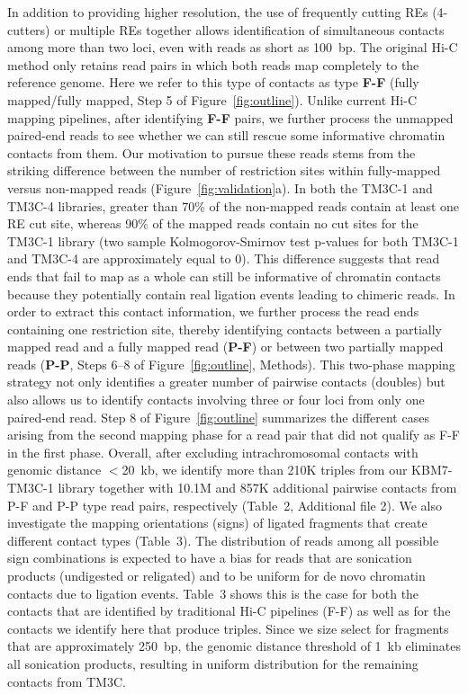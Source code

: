 In addition to providing higher resolution, the use of frequently cutting REs
(4-cutters) or multiple REs together allows identification of simultaneous
contacts among more than two loci, even with reads as short as
100~bp.
The original Hi-C method only retains read pairs in which
both reads map completely to the reference genome. Here we refer to
this type of contacts as type \textbf{F-F} (fully mapped/fully mapped,
Step 5 of Figure~\ref{fig:outline}). Unlike current Hi-C mapping
pipelines, after identifying {\bf F-F}
pairs, we further process the unmapped paired-end reads to see whether we can still
rescue some informative chromatin contacts from them. Our motivation to pursue
these reads stems from the striking difference between the number of restriction
sites within fully-mapped versus non-mapped reads
(Figure~\ref{fig:validation}a). In both the TM3C-1 and TM3C-4
libraries, greater than 70\% of the
non-mapped reads contain at least one RE cut site,
whereas 90\% of the mapped reads contain no cut sites for the TM3C-1 library
(two sample Kolmogorov-Smirnov test p-values for both TM3C-1 and TM3C-4 are approximately equal to 0).
This difference
suggests that read ends that fail to map as a whole can still be informative of
chromatin contacts because they potentially contain real ligation events leading
to chimeric reads. In order to extract this contact information, we further process
the read ends containing one restriction site, thereby identifying contacts
between a partially mapped read and a fully mapped read (\textbf{P-F})
or between two partially mapped reads (\textbf{P-P}, Steps 6--8 of
Figure~\ref{fig:outline}, Methods). This two-phase
mapping strategy not only identifies a
greater number of pairwise contacts (doubles) but also allows
us to identify contacts involving three or four loci from only one paired-end read.
Step 8 of Figure~\ref{fig:outline} summarizes the different cases arising from the second
mapping phase for a read pair that did not qualify as {F-F} in the
first phase. Overall, after excluding intrachromosomal contacts with
genomic distance $<$20~kb, we identify more than 210K triples from our KBM7-TM3C-1
library together with 10.1M and 857K additional pairwise contacts from {P-F}
and {P-P} type read pairs, respectively (Table~2, Additional file 2).
We also investigate the mapping orientations (signs) of ligated fragments that
create different contact types (Table~3). The distribution of reads among all possible
sign combinations is expected to have a bias for reads that are sonication products
(undigested or religated) and to be uniform for de novo chromatin contacts due
to ligation events. Table~3 shows this is the case for both the contacts that are
identified by traditional Hi-C pipelines (F-F) as well as for the contacts we identify
here that produce triples. Since we size select for fragments that are
approximately 250~bp, the
genomic distance threshold of 1~kb eliminates all sonication products, resulting
in uniform distribution for the remaining contacts from TM3C.



